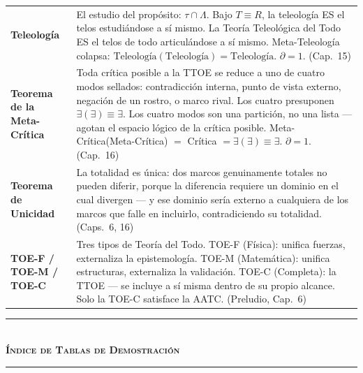 \documentclass[10pt, openany, oneside]{book}
\renewcommand{\normalsize}{\fontsize{10}{13}\selectfont}
\begin{document}
{\begin{tabular}{@{} l @{\hspace{0.6em}} p{} @{}}
\textbf{Teleología} & El estudio del propósito: $\tau \cap \Lambda$. Bajo $T \equiv R$, la teleología ES el telos estudiándose a sí mismo. La Teoría Teleológica del Todo ES el telos de todo articulándose a sí mismo. Meta-Teleología colapsa: $\text{Teleología}(\text{Teleología}) = \text{Teleología}$. $\partial = 1$. (Cap.\ 15) \\[0.3em]
\textbf{Teorema de la Meta-Crítica} & Toda crítica posible a la TTOE se reduce a uno de cuatro modos sellados: contradicción interna, punto de vista externo, negación de un rostro, o marco rival. Los cuatro presuponen $\exists(\exists) \equiv \exists$. Los cuatro modos son una partición, no una lista --- agotan el espacio lógico de la crítica posible. Meta-Crítica(Meta-Crítica) $=$ Crítica $= \exists(\exists) \equiv \exists$. $\partial = 1$. (Cap.\ 16) \\[0.3em]
\textbf{Teorema de Unicidad} & La totalidad es única: dos marcos genuinamente totales no pueden diferir, porque la diferencia requiere un dominio en el cual divergen --- y ese dominio sería externo a cualquiera de los marcos que falle en incluirlo, contradiciendo su totalidad. (Caps.\ 6, 16) \\[0.3em]
\textbf{TOE-F / TOE-M / TOE-C} & Tres tipos de Teoría del Todo. TOE-F (Física): unifica fuerzas, externaliza la epistemología. TOE-M (Matemática): unifica estructuras, externaliza la validación. TOE-C (Completa): la TTOE --- se incluye a sí misma dentro de su propio alcance. Solo la TOE-C satisface la AATC. (Preludio, Cap.\ 6) \\[0.3em]
\end{tabular}
}

\vspace{1.5em}


\begin{center}
    \rule{0.3\textwidth}{0.4pt}\\[0.5em]
    {\normalsize\bfseries\scshape Índice de Tablas de Demostración}\\[0.3em]
    \rule{0.3\textwidth}{0.4pt}
\end{center}

\vspace{1em}
\end{document}

